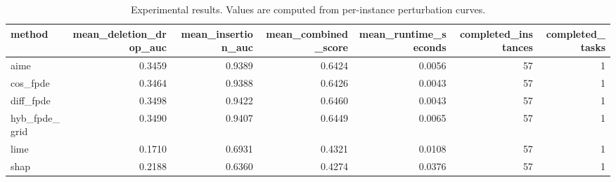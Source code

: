 \begin{table}[t]
\caption{Experimental results. Values are computed from per-instance perturbation curves.}
\label{tab:main_results_computed}
\centering
\begin{tabular}{lrrrrrr}
\toprule
method & mean\_deletion\_drop\_auc & mean\_insertion\_auc & mean\_combined\_score & mean\_runtime\_seconds & completed\_instances & completed\_tasks \\
\midrule
aime & 0.3459 & 0.9389 & 0.6424 & 0.0056 & 57 & 1 \\
cos\_fpde & 0.3464 & 0.9388 & 0.6426 & 0.0043 & 57 & 1 \\
diff\_fpde & 0.3498 & 0.9422 & 0.6460 & 0.0043 & 57 & 1 \\
hyb\_fpde\_grid & 0.3490 & 0.9407 & 0.6449 & 0.0065 & 57 & 1 \\
lime & 0.1710 & 0.6931 & 0.4321 & 0.0108 & 57 & 1 \\
shap & 0.2188 & 0.6360 & 0.4274 & 0.0376 & 57 & 1 \\
\bottomrule
\end{tabular}

\end{table}
